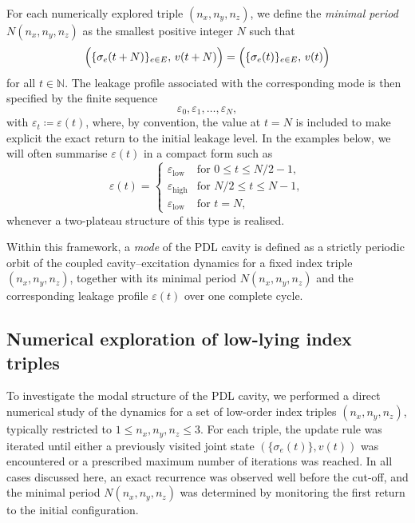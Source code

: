 \documentclass{article}
\theoremstyle{definition}
\begin{document}
For each numerically explored triple $(n_x,n_y,n_z)$, we define the \emph{minimal period} $N(n_x,n_y,n_z)$ as the smallest positive integer $N$ such that
\[
\Bigl(\{\sigma_e(t+N)\}_{e \in E},\, v(t+N)\Bigr)
=
\Bigl(\{\sigma_e(t)\}_{e \in E},\, v(t)\Bigr)
\]
for all $t \in \mathbb{N}$.\cite{Effective_Fields_PDL_2026} The leakage profile associated with the corresponding mode is then specified by the finite sequence
\[
\varepsilon_0, \varepsilon_1, \dots, \varepsilon_{N},
\]
with $\varepsilon_t \coloneqq \varepsilon(t)$, where, by convention, the value at $t = N$ is included to make explicit the exact return to the initial leakage level.\cite{Exponent_18_PDL_2026} In the examples below, we will often summarise $\varepsilon(t)$ in a compact form such as
\[
\varepsilon(t) =
\begin{cases}
\varepsilon_{\mathrm{low}} & \text{for } 0 \le t \le N/2 - 1,\\[2pt]
\varepsilon_{\mathrm{high}} & \text{for } N/2 \le t \le N-1,\\[2pt]
\varepsilon_{\mathrm{low}} & \text{for } t = N,
\end{cases}
\]
whenever a two-plateau structure of this type is realised.\cite{Effective_Fields_PDL_2026}

Within this framework, a \emph{mode} of the PDL cavity is defined as a strictly periodic orbit of the coupled cavity–excitation dynamics for a fixed index triple $(n_x,n_y,n_z)$, together with its minimal period $N(n_x,n_y,n_z)$ and the corresponding leakage profile $\varepsilon(t)$ over one complete cycle.

\subsection{Numerical exploration of low-lying index triples}

To investigate the modal structure of the PDL cavity, we performed a direct numerical study of the dynamics for a set of low-order index triples $(n_x,n_y,n_z)$, typically restricted to $1 \leq n_x,n_y,n_z \leq 3$.\cite{Effective_Fields_PDL_2026} For each triple, the update rule was iterated until either a previously visited joint state $(\{\sigma_e(t)\},v(t))$ was encountered or a prescribed maximum number of iterations was reached. In all cases discussed here, an exact recurrence was observed well before the cut-off, and the minimal period $N(n_x,n_y,n_z)$ was determined by monitoring the first return to the initial configuration.\cite{Effective_Fields_PDL_2026}
\end{document}

